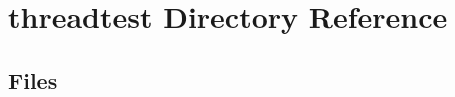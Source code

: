 \section{threadtest Directory Reference}
\label{dir_9abc0fb310c84b2f3a58841326479d40}
\subsection*{Files}
\begin{DoxyCompactItemize}
\end{DoxyCompactItemize}
